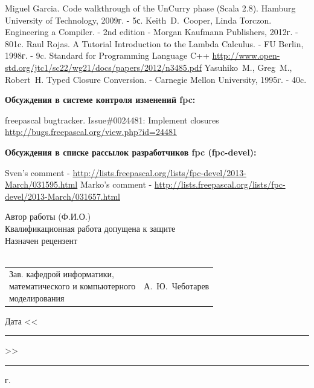 \documentclass{imcs}
\begin{document}
\begin{thebibliography}{99}
 Miguel Garcia. Code walkthrough of the UnCurry phase (Scala 2.8). Hamburg University of Technology, 2009г. - 5с.
 Keith~D.~Cooper, Linda Torczon. Engineering a Compiler. - 2nd edition - Morgan Kaufmann Publishers, 2012г. - 801c.
 Raul Rojas. A Tutorial Introduction to the Lambda Calculus. - FU Berlin, 1998г. - 9c.
 Standard for Programming Language C++ \url{http://www.open-std.org/jtc1/sc22/wg21/docs/papers/2012/n3485.pdf}
 Yasuhiko~M., Greg~M., Robert~H. Typed  Closure Conversion. - Carnegie Mellon University, 1995г. - 40c.

  
{\bf Обсуждения в системе контроля изменений fpc:}  
  
 freepascal bugtracker. Issue\#0024481: Implement closures \url{http://bugs.freepascal.org/view.php?id=24481}
  
{\bf Обсуждения в списке рассылок разработчиков fpc (fpc-devel):}

 Sven's comment - \url{http://lists.freepascal.org/lists/fpc-devel/2013-March/031595.html}
 Marko's comment - \url{http://lists.freepascal.org/lists/fpc-devel/2013-March/031657.html}


  
\end{thebibliography}

\pagebreak

\noindent Автор работы  (Ф.И.О.)\\

\noindent{}Квалификационная работа допущена к защите\\

\noindent{}Назначен рецензент\\
\\

\vspace{2\baselineskip}
\noindent\begin{tabular}{p{} p{}}
\parbox{8cm}{Зав. кафедрой информатики,\\ математического и компьютерного\\ моделирования} &
\hfill А.~Ю.~Чеботарев\\
\end{tabular}
\vspace{2\baselineskip}
\begin{flushright}
Дата <<\rule{1cm}{0.5pt}>>\rule{3cm}{0.5pt} г.
\end{flushright}
\end{document}
